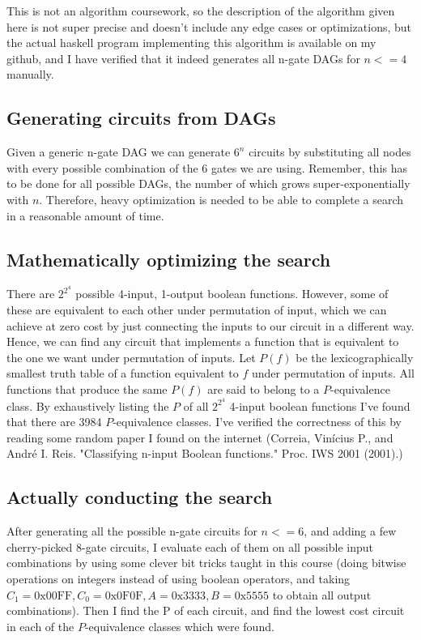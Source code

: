 \documentclass[12pt]{article}
\begin{document}
This is not an algorithm coursework, so the description of the algorithm given here is not super precise and doesn't
include any edge cases or optimizations, but the actual haskell program implementing this algorithm is available on my github,
and I have verified that it indeed generates all n-gate DAGs for $n <= 4$ manually.

\subsection {Generating circuits from DAGs}

Given a generic n-gate DAG we can generate $6^n$ circuits by substituting all nodes with every possible combination of the 
6 gates we are using. Remember, this has to be done for all possible DAGs, the number of which grows super-exponentially with $n$.
Therefore, heavy optimization is needed to be able to complete a search in a reasonable amount of time.

\subsection {Mathematically optimizing the search}

There are $2^{2^4}$ possible 4-input, 1-output boolean functions. However, some of these are equivalent to each other under
permutation of input, which we can achieve at zero cost by just connecting the inputs to our circuit in a different way. Hence,
we can find any circuit that implements a function that is equivalent to the one we want under permutation of inputs. Let 
$P(f)$ be the lexicographically smallest truth table of a function equivalent to $f$ under permutation of inputs. All functions
that produce the same $P(f)$ are said to belong to a $P$-equivalence class. By exhaustively listing the $P$ of all  $2^{2^4}$ 
4-input boolean functions I've found that there are 3984 $P$-equivalence classes. I've verified the correctness of this by
reading some random paper I found on the internet (Correia, Vinícius P., and André I. Reis. "Classifying n-input Boolean functions." Proc. IWS 2001 (2001).)

\subsection {Actually conducting the search}

After generating all the possible n-gate circuits for $n <= 6$, and adding a few cherry-picked 8-gate circuits,
I evaluate each of them on all possible input combinations by using some clever
bit tricks taught in this course (doing bitwise operations on integers instead of using boolean operators, and taking
$C_1 = \text{0x00FF}, C_0 = \text{0x0F0F}, A = \text{0x3333}, B = \text{0x5555}$ to obtain all output combinations). Then I find the P of each circuit, and
find the lowest cost circuit in each of the $P$-equivalence classes which were found.
\end{document}
